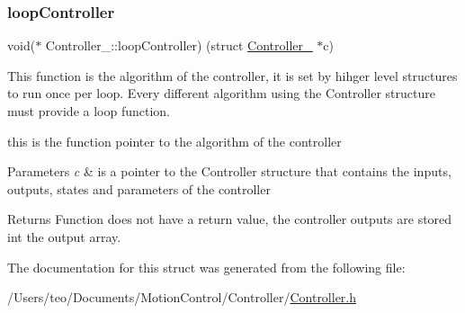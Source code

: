 \subsubsection{\texorpdfstring{loop\+Controller}{loopController}}
{\footnotesize\ttfamily void($\ast$ Controller\+\_\+\+::loop\+Controller) (struct \hyperlink{struct_controller__}{Controller\+\_\+} $\ast$c)}



This function is the algorithm of the controller, it is set by hihger level structures to run once per loop. Every different algorithm using the Controller structure must provide a loop function. 

this is the function pointer to the algorithm of the controller 
\begin{DoxyParams}{Parameters}
{\em c} & is a pointer to the Controller structure that contains the inputs, outputs, states and parameters of the controller \\
\hline
\end{DoxyParams}
\begin{DoxyReturn}{Returns}
Function does not have a return value, the controller outputs are stored int the output array. 
\end{DoxyReturn}


The documentation for this struct was generated from the following file\+:\begin{DoxyCompactItemize}
\item 
/\+Users/teo/\+Documents/\+Motion\+Control/\+Controller/\hyperlink{_controller_8h}{Controller.\+h}\end{DoxyCompactItemize}

